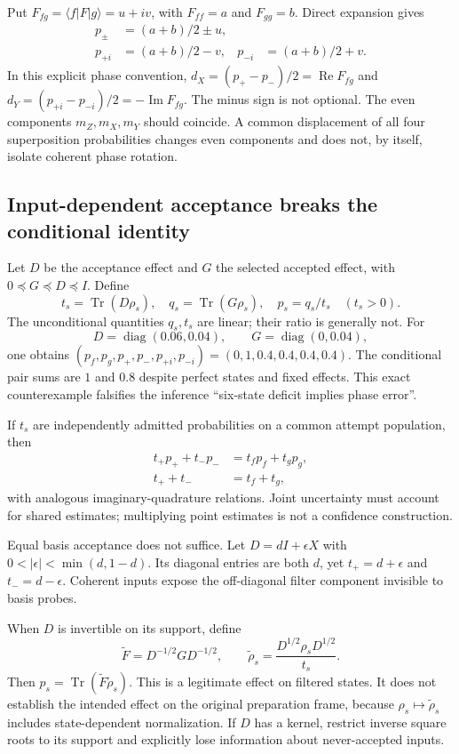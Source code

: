 \documentclass[11pt,a4paper]{article}
\newcommand{\tr}{\operatorname{Tr}}\newcommand{\TV}{\operatorname{TV}}\newcommand{\kerop}{\operatorname{ker}}\newcommand{\rank}{\operatorname{rank}}\newcommand{\diag}{\operatorname{diag}}\newcommand{\ran}{\operatorname{ran}}\newcommand{\norm}[1]{\left\lVert#1\right\rVert}\newcommand{\ket}[1]{\lvert#1\rangle}\newcommand{\bra}[1]{\langle#1\rvert}
\begin{document}
Put $F_{fg}=\bra fF\ket g=u+iv$, with $F_{ff}=a$ and $F_{gg}=b$. Direct expansion gives
\begin{align}
p_\pm&=(a+b)/2\pm u,\\
p_{+i}&=(a+b)/2-v,&p_{-i}&=(a+b)/2+v.
\end{align}
In this explicit phase convention, $d_X=(p_+-p_-)/2=\operatorname{Re}F_{fg}$ and $d_Y=(p_{+i}-p_{-i})/2=-\operatorname{Im}F_{fg}$. The minus sign is not optional. The even components $m_Z,m_X,m_Y$ should coincide. A common displacement of all four superposition probabilities changes even components and does not, by itself, isolate coherent phase rotation.

\subsection{Input-dependent acceptance breaks the conditional identity}
Let $D$ be the acceptance effect and $G$ the selected accepted effect, with $0\preceq G\preceq D\preceq I$. Define
\begin{equation}
t_s=\tr(D\rho_s),\quad q_s=\tr(G\rho_s),\quad p_s=q_s/t_s\quad(t_s>0).
\end{equation}
The unconditional quantities $q_s,t_s$ are linear; their ratio is generally not. For
\begin{equation}
D=\diag(0.06,0.04),\qquad G=\diag(0,0.04),
\end{equation}
one obtains $(p_f,p_g,p_+,p_-,p_{+i},p_{-i})=(0,1,0.4,0.4,0.4,0.4)$. The conditional pair sums are $1$ and $0.8$ despite perfect states and fixed effects. This exact counterexample falsifies the inference ``six-state deficit implies phase error''.

If $t_s$ are independently admitted probabilities on a common attempt population, then
\begin{align}
t_+p_++t_-p_-&=t_fp_f+t_gp_g,\\
t_++t_-&=t_f+t_g,
\end{align}
with analogous imaginary-quadrature relations. Joint uncertainty must account for shared estimates; multiplying point estimates is not a confidence construction.

Equal basis acceptance does not suffice. Let $D=dI+\epsilon X$ with $0<|\epsilon|<\min(d,1-d)$. Its diagonal entries are both $d$, yet $t_+=d+\epsilon$ and $t_-=d-\epsilon$. Coherent inputs expose the off-diagonal filter component invisible to basis probes.

When $D$ is invertible on its support, define
\begin{equation}
\widetilde F=D^{-1/2}GD^{-1/2},\qquad
\widetilde\rho_s=\frac{D^{1/2}\rho_sD^{1/2}}{t_s}.
\end{equation}
Then $p_s=\tr(\widetilde F\widetilde\rho_s)$. This is a legitimate effect on filtered states. It does not establish the intended effect on the original preparation frame, because $\rho_s\mapsto\widetilde\rho_s$ includes state-dependent normalization. If $D$ has a kernel, restrict inverse square roots to its support and explicitly lose information about never-accepted inputs.
\end{document}
